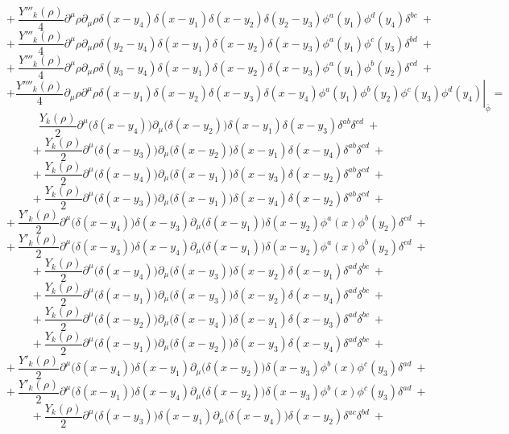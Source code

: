 $$+\ \frac{Y'''_k(\rho)}{4}\partial^\mu\rho\partial_\mu\rho\delta(x - y_4)\delta(x - y_1)\delta(x - y_2)\delta(y_2 - y_3)\phi^a(y_1)\phi^d(y_4)\delta^{bc} \ +$$
$$+\ \frac{Y'''_k(\rho)}{4}\partial^\mu\rho\partial_\mu\rho\delta(y_2 - y_4)\delta(x - y_1)\delta(x - y_2)\delta(x - y_3)\phi^a(y_1)\phi^c(y_3)\delta^{bd} \ +$$
$$+\ \frac{Y'''_k(\rho)}{4}\partial^\mu\rho\partial_\mu\rho\delta(y_3 - y_4)\delta(x - y_1)\delta(x - y_2)\delta(x - y_3)\phi^a(y_1)\phi^b(y_2)\delta^{cd} \ +$$
$$+\left. \frac{Y''''_k(\rho)}{4}\partial_\mu\rho\partial^\mu\rho\delta(x-y_1)\delta(x - y_2)\delta(x - y_3)\delta(x-y_4) \phi^a(y_1)\phi^b(y_2)\phi^c(y_3)\phi^d(y_4)\right|_{\bar{\phi}} =$$
$$ \frac{Y_k(\rho)}{2}\partial^\mu\big(\delta(x - y_4)\big)\partial_\mu\big(\delta(x - y_2)\big)\delta(x - y_1)\delta(x - y_3) \delta^{ab}\delta^{cd}\ +$$
$$+\ \frac{Y_k(\rho)}{2}\partial^\mu\big(\delta(x - y_3)\big)\partial_\mu\big(\delta(x - y_2)\big)\delta(x - y_1)\delta(x - y_4)\delta^{ab}\delta^{cd} \ +$$
$$+\ \frac{Y_k(\rho)}{2}\partial^\mu\big(\delta(x - y_4)\big)\partial_\mu\big(\delta(x - y_1)\big)\delta(x - y_3)\delta(x - y_2)\delta^{ab}\delta^{cd} \ +$$
$$+\ \frac{Y_k(\rho)}{2}\partial^\mu\big(\delta(x - y_3)\big)\partial_\mu\big(\delta(x - y_1)\big)\delta(x - y_4)\delta(x - y_2)\delta^{ab}\delta^{cd} \ +$$
$$+\ \frac{Y'_k(\rho)}{2}\partial^\mu\big(\delta(x - y_4)\big)\delta(x - y_3)\partial_\mu\big(\delta(x - y_1)\big)\delta(x - y_2)\phi^a(x)\phi^b(y_2)\delta^{cd} \ +$$
$$+\ \frac{Y'_k(\rho)}{2}\partial^\mu\big(\delta(x - y_3)\big)\delta(x - y_4)\partial_\mu\big(\delta(x - y_1)\big)\delta(x - y_2)\phi^a(x)\phi^b(y_2)\delta^{cd} \ +$$
$$+\ \frac{Y_k(\rho)}{2}\partial^\mu\big(\delta(x - y_4)\big)\partial_\mu\big(\delta(x - y_3)\big)\delta(x - y_2)\delta(x - y_1) \delta^{ad}\delta^{bc}\ +$$
$$+\ \frac{Y_k(\rho)}{2}\partial^\mu\big(\delta(x - y_1)\big)\partial_\mu\big(\delta(x - y_3)\big)\delta(x - y_2)\delta(x - y_4) \delta^{ad}\delta^{bc}\ +$$
$$+\ \frac{Y_k(\rho)}{2}\partial^\mu\big(\delta(x - y_2)\big)\partial_\mu\big(\delta(x - y_4)\big)\delta(x - y_1)\delta(x - y_3) \delta^{ad}\delta^{bc}\ +$$
$$+\ \frac{Y_k(\rho)}{2}\partial^\mu\big(\delta(x - y_1)\big)\partial_\mu\big(\delta(x - y_2)\big)\delta(x - y_3)\delta(x - y_4) \delta^{ad}\delta^{bc}\ +$$
$$+\ \frac{Y'_k(\rho)}{2}\partial^\mu\big(\delta(x - y_4)\big)\delta(x - y_1)\partial_\mu\big(\delta(x - y_2)\big)\delta(x - y_3)\phi^b(x)\phi^c(y_3)\delta^{ad} \ +$$
$$+\ \frac{Y'_k(\rho)}{2}\partial^\mu\big(\delta(x - y_1)\big)\delta(x - y_4)\partial_\mu\big(\delta(x - y_2)\big)\delta(x - y_3)\phi^b(x)\phi^c(y_3)\delta^{ad} \ +$$
$$+\ \frac{Y_k(\rho)}{2}\partial^\mu\big(\delta(x - y_3)\big)\delta(x - y_1)\partial_\mu\big(\delta(x - y_4)\big)\delta(x - y_2)\delta^{ac}\delta^{bd} \ +$$
